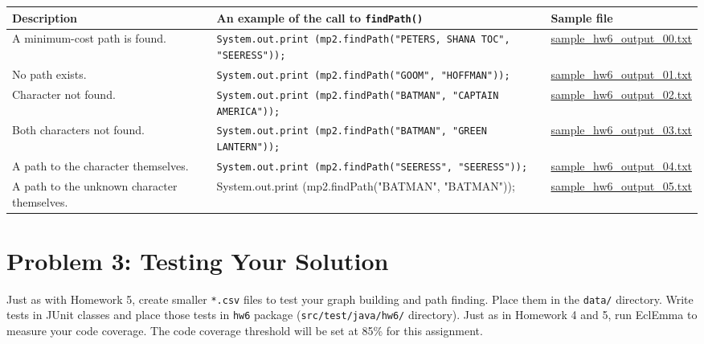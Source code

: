 \documentclass[11pt]{article}
\begin{document}
\begin{center}
\begin{tabular}{ | m{5cm} | m{5cm}| m{5cm} | } 
  \hline
  \textbf{Description} & \textbf{An example of the call to \texttt{findPath()}} & \textbf{Sample file} \\ 
  \hline
  A minimum-cost path is found. & \texttt{System.out.print
  (mp2.findPath("PETERS, SHANA TOC", "SEERESS"));} & \href{https://www.cs.rpi.edu/academics/courses/spring23/csci2600/Documents/sample_hw6_output_00.txt}{sample\_hw6\_output\_00.txt}\\ 
  \hline
  No path exists. & \texttt{System.out.print
  (mp2.findPath("GOOM", "HOFFMAN"));} & \href{https://www.cs.rpi.edu/academics/courses/spring23/csci2600/Documents/sample_hw6_output_01.txt}{sample\_hw6\_output\_01.txt} \\ 
  \hline
  Character not found. & \texttt{System.out.print
  (mp2.findPath("BATMAN", "CAPTAIN AMERICA"));} & \href{https://www.cs.rpi.edu/academics/courses/spring23/csci2600/Documents/sample_hw6_output_02.txt}{sample\_hw6\_output\_02.txt} \\
  \hline
  Both characters not found. & \texttt{System.out.print
  (mp2.findPath("BATMAN", "GREEN LANTERN"));} & \href{https://www.cs.rpi.edu/academics/courses/spring23/csci2600/Documents/sample_hw6_output_03.txt}{sample\_hw6\_output\_03.txt} \\
  \hline
  A path to the character themselves. & \texttt{System.out.print
  (mp2.findPath("SEERESS", "SEERESS"));} & \href{https://www.cs.rpi.edu/academics/courses/spring23/csci2600/Documents/sample_hw6_output_04.txt}{sample\_hw6\_output\_04.txt} \\
  \hline
  A path to the unknown character themselves. & System.out.print
  (mp2.findPath("BATMAN", "BATMAN")); & \href{https://www.cs.rpi.edu/academics/courses/spring23/csci2600/Documents//sample_hw6_output_05.txt}{sample\_hw6\_output\_05.txt} \\
  \hline
\end{tabular}
\end{center}

\section*{Problem 3: Testing Your Solution}
\label{sec:Problem 3}

\noindent Just as with Homework 5, create smaller \texttt{*.csv} files to test your graph building and path finding. Place them in the \texttt{data/} directory. Write tests in JUnit classes and place those tests in \texttt{hw6} package (\texttt{src/test/java/hw6/} directory). Just as in Homework 4 and 5, run EclEmma to measure your code coverage. The code coverage threshold will be set at 85\% for this assignment.
\end{document}
